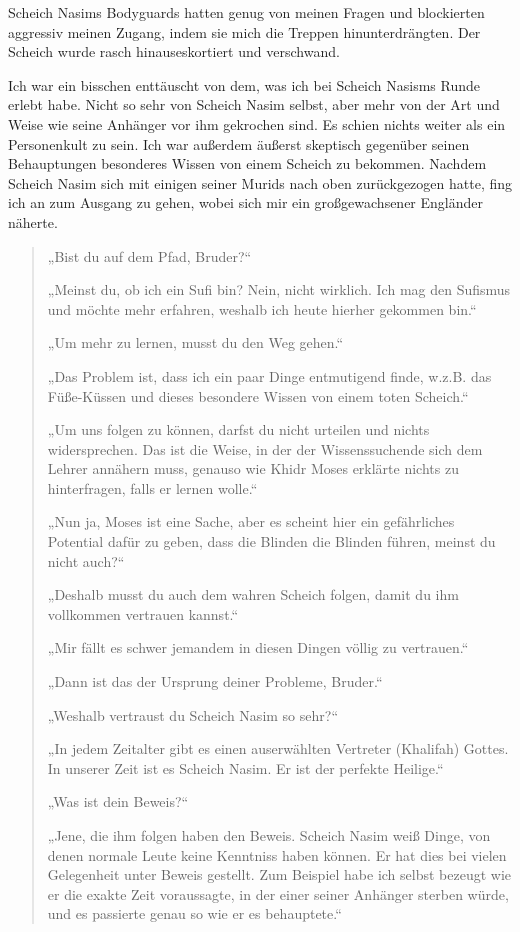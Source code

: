 \documentclass[12pt]{memoir}
\begin{document}
Scheich Nasims Bodyguards hatten genug von meinen Fragen
und blockierten aggressiv meinen Zugang,
indem sie mich die Treppen hinunterdrängten.
Der Scheich wurde rasch hinauseskortiert und verschwand.

Ich war ein bisschen enttäuscht von dem,
was ich bei Scheich Nasisms Runde erlebt habe.
Nicht so sehr von Scheich Nasim selbst, aber mehr von der Art und Weise
wie seine Anhänger vor ihm gekrochen sind.
Es schien nichts weiter als ein Personenkult zu sein.
Ich war außerdem äußerst skeptisch gegenüber seinen Behauptungen
besonderes Wissen von einem Scheich zu bekommen.
Nachdem Scheich Nasim sich mit einigen seiner Murids
nach oben zurückgezogen hatte,
fing ich an zum Ausgang zu gehen,
wobei sich mir ein großgewachsener Engländer näherte.

\begin{quote}
„Bist du auf dem Pfad, Bruder?“

„Meinst du, ob ich ein Sufi bin?
Nein, nicht wirklich.
Ich mag den Sufismus und möchte mehr erfahren,
weshalb ich heute hierher gekommen bin.“

„Um mehr zu lernen, musst du den Weg gehen.“

„Das Problem ist, dass ich ein paar Dinge entmutigend finde,
w.z.B. das Füße-Küssen und dieses besondere Wissen von einem toten Scheich.“

„Um uns folgen zu können, darfst du nicht urteilen und nichts widersprechen.
Das ist die Weise, in der der Wissenssuchende sich dem Lehrer annähern muss,
genauso wie Khidr Moses erklärte nichts zu hinterfragen,
falls er lernen wolle.“

„Nun ja, Moses ist eine Sache,
aber es scheint hier ein gefährliches Potential dafür zu geben,
dass die Blinden die Blinden führen, meinst du nicht auch?“

„Deshalb musst du auch dem wahren Scheich folgen,
damit du ihm vollkommen vertrauen kannst.“

„Mir fällt es schwer jemandem in diesen Dingen völlig zu vertrauen.“

„Dann ist das der Ursprung deiner Probleme, Bruder.“

„Weshalb vertraust du Scheich Nasim so sehr?“

„In jedem Zeitalter gibt es einen auserwählten Vertreter (Khalifah) Gottes.
In unserer Zeit ist es Scheich Nasim. Er ist der perfekte Heilige.“

„Was ist dein Beweis?“

„Jene, die ihm folgen haben den Beweis. Scheich Nasim weiß Dinge,
von denen normale Leute keine Kenntniss haben können.
Er hat dies bei vielen Gelegenheit unter Beweis gestellt.
Zum Beispiel habe ich selbst bezeugt wie er die exakte Zeit voraussagte,
in der einer seiner Anhänger sterben würde,
und es passierte genau so wie er es behauptete.“


\end{quote}
\end{document}
